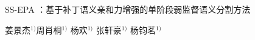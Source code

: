 \def\pbLen{0.9\textwidth}%
{%
  \centering
  \vspace {11mm}
  \begin{CJK*}{UTF8}{zhhei}
  {
     SS-EPA ：基于补丁语义亲和力增强的单阶段弱监督语义分割方法
  }
  \end{CJK*}

  \vskip 5mm

  {
    \centering
    \begin{CJK*}{UTF8}{song}
      姜景杰$^{1)}$\quad  周肖桐$^{1)}$ \quad 杨欢$^{1)}$ \quad 张轩豪$^{1)}$ \quad 杨钧茗$^{1)}$
    \end{CJK*}
  }

  \vspace {5mm}


  \vskip 5mm
}

